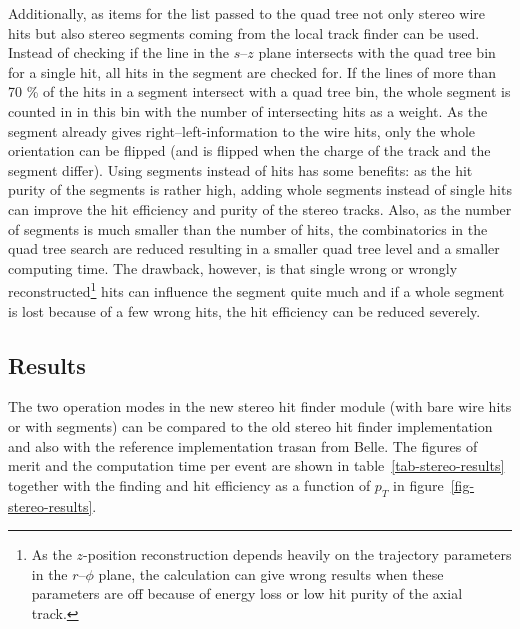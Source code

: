 Additionally, as items for the list passed to the quad tree not only stereo wire hits but also stereo segments coming from the local track finder can be used. Instead of checking if the line in the $s$--$z$ plane intersects with the quad tree bin for a single hit, all hits in the segment are checked for. If the lines of more than 70 \% of the hits in a segment intersect with a quad tree bin, the whole segment is counted in in this bin with the number of intersecting hits as a weight. As the segment already gives right--left-information to the wire hits, only the whole orientation can be flipped (and is flipped when the charge of the track and the segment differ). Using segments instead of hits has some benefits: as the hit purity of the segments is rather high, adding whole segments instead of single hits can improve the hit efficiency and purity of the stereo tracks. Also, as the number of segments is much smaller than the number of hits, the combinatorics in the quad tree search are reduced resulting in a smaller quad tree level and a smaller computing time. The drawback, however, is that single wrong or wrongly reconstructed\footnote{As the $z$-position reconstruction depends heavily on the trajectory parameters in the $r$--$\phi$ plane, the calculation can give wrong results when these parameters are off because of energy loss or low hit purity of the axial track.} hits can influence the segment quite much and if a whole segment is lost because of a few wrong hits, the hit efficiency can be reduced severely.

\subsection{Results}

The two operation modes in the new stereo hit finder module (with bare wire hits or with segments) can be compared to the old stereo hit finder implementation and also with the reference implementation trasan from Belle. The figures of merit and the computation time per event are shown in table~\ref{tab-stereo-results} together with the finding and hit efficiency as a function of $p_T$ in figure~\ref{fig-stereo-results}. 

